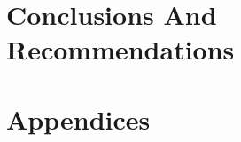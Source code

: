 \documentclass[12pt,a4paper,twoside]{report}
\begin{document}
\chapter{Conclusions And Recommendations}\label{ch:summary-and-recomend}
  
  


\iffalse
  
  
  
  
  
  
  
  
  
  
  
  
  
\fi

\clearpage
\appendix
\chapter*{Appendices}
\renewcommand{\thesection}{\Alph{section}}


% 
%
\iftrue
  \printbibliography
\fi

\printglossary[type=\acronymtype,title=Acronyms]

\end{document}
